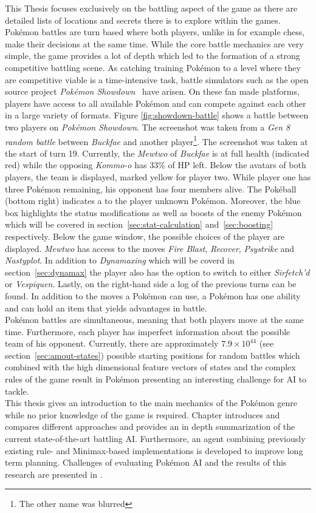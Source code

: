 This Thesis focuses exclusively on the battling aspect of the game as there are detailed lists of locations and
secrets there is to explore within the games. Pokémon battles are turn based where both players, unlike in 
for example chess, make their decisions at the same time. While the core battle mechanics are very simple, 
the game provides a lot of depth which led to the formation of a strong competitive battling scene.
As catching training Pokémon to a level where they are competitive viable is a time-intensive task, battle
simulators such as the open source project \textit{Pokémon Showdown}~\autocite{Showdown:Github} have arisen. On these fan made
platforms, players have access to all available Pokémon and can compete against each other in a large variety
of formats.
Figure \ref{fig:showdown-battle} shows a battle between two players on 
\textit{Pokémon Showdown}. The screenshot was taken from a \textit{Gen 8 random battle} between 
\textit{Buckfae} and another player\footnote{The other name was blurred}. The screenshot was taken
at the start of turn 19. Currently, the \textit{Mewtwo} of \textit{Buckfae} is at full health (indicated
red) while the opposing \textit{Kommo-o} has 33\% of \ac{HP} left. Below the avatars of both players,
the team is displayed, marked yellow for player two. While player one has three Pokémon remaining,
his opponent has four members alive. The Pokéball (bottom right) indicates a to the player unknown Pokémon.
Moreover, the blue box highlights the status modifications as well as boosts of the enemy Pokémon which will be
covered in section~\ref{sec:stat-calculation} and~\ref{sec:boosting} respectively.
Below the game window, the possible choices of the
player are displayed. \textit{Mewtwo} has access to the moves \textit{Fire Blast}, \textit{Recover}, \textit{Psystrike}
and \textit{Nastyplot}. In addition to \textit{Dynamaxing} which will be coverd in section~\ref{sec:dynamax} the player
also has the option to switch to either \textit{Sirfetch'd} or \textit{Vespiquen}. Lastly,
on the right-hand side a log of the previous turns can be found. In addition to the moves a Pokémon can use,
a Pokémon has one ability and can hold an item that yields advantages in battle. 
\\
Pokémon battles are simultaneous, meaning that both players move at the same time. Furthermore, each player has imperfect
information about the possible team of his opponent. 
Currently, there are approximately $7.9 \times 10^{44}$ 
(see section~\ref{sec:amout-states}) possible
starting positions for random battles which combined with the high dimensional feature vectors of states 
and the complex rules of the game result in Pokémon presenting an interesting challenge for AI to tackle. 
\\
This thesis gives an introduction to the main mechanics of the Pokémon genre while no prior knowledge of the 
game is required. 
Chapter  introduces and compares different approaches and provides an in depth summarization
of the current state-of-the-art battling AI. 
Furthermore, an agent combining previously existing rule- and 
Minimax-based implementations is developed to improve long term planning.
Challenges of evaluating Pokémon AI and the results of this research
are presented in .